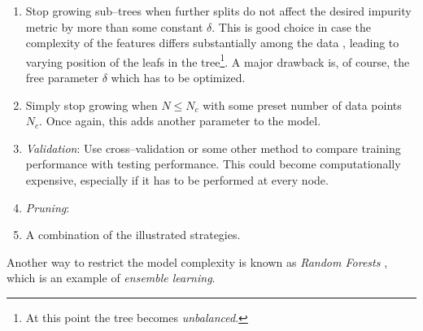 \begin{enumerate}
\item \label{itm:constant-metric} Stop growing sub--trees when further splits do not affect the desired impurity metric by more than some constant $\delta$. This is good choice in case the complexity of the features differs substantially among the data \citep{duda2001}, leading to varying position of the leafs in the tree\footnote{At this point the tree becomes \emph{unbalanced}.}. A major drawback is, of course, the free parameter $\delta$ which has to be optimized.
\item \label{itm:constant-data-points} Simply stop growing when $N \le N_c$ with some preset number of data points $N_c$. Once again, this adds another parameter to the model.
\item \label{itm:validation} \emph{Validation}: Use cross--validation or some other method to compare training performance with testing performance. This could become computationally expensive, especially if it has to be performed at every node.
\item \label{itm:pruning} \emph{Pruning}: %
\item A combination of the illustrated strategies.
\end{enumerate}







Another way to restrict the model complexity is known as \emph{Random Forests} \citep{breiman2001}, which is an example of \emph{ensemble learning}.



%